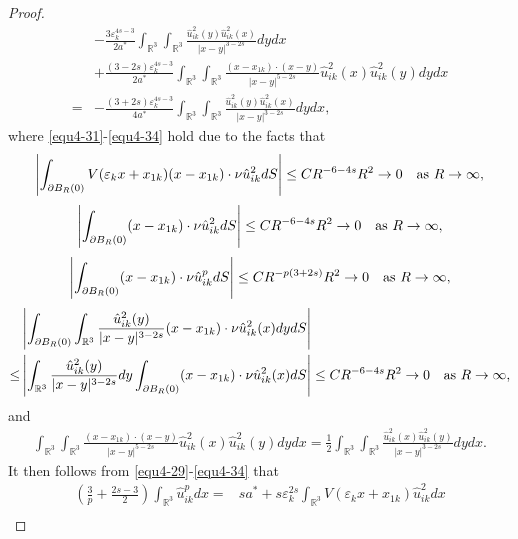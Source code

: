 \documentclass[10pt,a4paper]{amsart}
\begin{document}
\begin{proof}
\begin{equation}
\begin{split}
				&-\frac{3\varepsilon_{k}^{4s-3}}{2a^{\ast}}\int_{\mathbb{R}^{3}}\int_{\mathbb{R}^{3}}\frac{\hat{u}_{ik}^{2}(y)\hat{u}_{ik}^{2}(x)}{|x-y|^{3-2s}}dydx\\
				&+\frac{(3-2s)\varepsilon_{k}^{4s-3}}{2a^{\ast}}\int_{\mathbb{R}^{3}}\int_{\mathbb{R}^{3}}\frac{(x-x_{1k})\cdot(x-y)}{|x-y|^{5-2s}}\hat{u}^{2}_{ik}(x)\hat{u}^{2}_{ik}(y)dydx\\
				=&-\frac{(3+2s)\varepsilon_{k}^{4s-3}}{4a^{\ast}}\int_{\mathbb{R}^{3}}\int_{\mathbb{R}^{3}}\frac{\hat{u}_{ik}^{2}(y)\hat{u}_{ik}^{2}(x)}{|x-y|^{3-2s}}dydx,
			\end{split}
		\end{equation}
		where \eqref{equ4-31}-\eqref{equ4-34} hold due to the facts that
		\begin{equation*}
			\left| \int_{\partial B_{R}(0)}V(\varepsilon_{k}x+x_{1k})(x-x_{1k})\cdot\nu\hat{u}_{ik}^{2}dS\right|
			\leq CR^{-6-4s}R^{2}\rightarrow0\quad \hbox{as $R\rightarrow\infty$},
		\end{equation*}
		\begin{equation*}
			\left| \int_{\partial B_{R}(0)}(x-x_{1k})\cdot\nu\hat{u}_{ik}^{2}dS\right|
			\leq CR^{-6-4s}R^{2}\rightarrow0\quad \hbox{as $R\rightarrow\infty$},
		\end{equation*}
		\begin{equation*}
			\left| \int_{\partial B_{R}(0)}(x-x_{1k})\cdot\nu\hat{u}_{ik}^{p}dS\right| \leq CR^{-p(3+2s)}R^{2}\rightarrow0\quad \hbox{as $R\rightarrow\infty$},
		\end{equation*}
		\begin{align*} 
			&	\left| \int_{ \partial B_{R}(0)}\int_{\mathbb{R}^{3}}\frac{\hat{u}_{ik}^{2}(y)}{|x-y|^{3-2s}}(x-x_{1k})\cdot\nu\hat{u}_{ik}^{2}(x)dydS\right| \\
			\leq&\left| \int_{\mathbb{R}^{3}}\frac{\hat{u}_{ik}^{2}(y)}{|x-y|^{3-2s}}dy\int_{ \partial B_{R}(0)}(x-x_{1k})\cdot\nu\hat{u}_{ik}^{2}(x)dS\right| \leq CR^{-6-4s}R^{2}\rightarrow0\quad \hbox{as $R\rightarrow\infty$},
		\end{align*}
		and
		\begin{align*} 
			\int_{\mathbb{R}^{3}}\int_{\mathbb{R}^{3}}\frac{(x-x_{1k})\cdot(x-y)}{|x-y|^{5-2s}}\hat{u}^{2}_{ik}(x)\hat{u}^{2}_{ik}(y)dydx
			=\frac{1}{2}\int_{\mathbb{R}^{3}}\int_{\mathbb{R}^{3}}\frac{\hat{u}^{2}_{ik}(x)\hat{u}^{2}_{ik}(y)}{|x-y|^{3-2s}}dydx.
		\end{align*}
		It then follows from \eqref{equ4-29}-\eqref{equ4-34} that
		\begin{align*} 
			\left( \frac{3}{p}+\frac{2s-3}{2}\right) \int_{\mathbb{R}^{3}}\hat{u}_{ik}^{p}dx=&sa^{\ast}+s\varepsilon_{k}^{2s}\int_{\mathbb{R}^{3}}V(\varepsilon_{k}x+x_{1k})\hat{u}_{ik}^{2}dx\\

\end{align*}
\end{proof}
\end{document}
